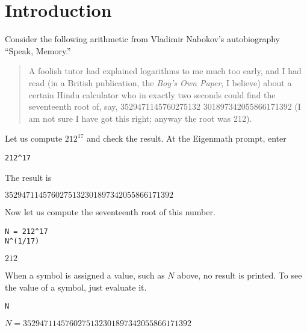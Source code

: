 \section{Introduction}

\noindent
Consider the following arithmetic from Vladimir Nabokov's autobiography ``Speak, Memory.''

\begin{quote}
A foolish tutor had explained logarithms to me much too early, and I had
read (in a British publication, the {\it Boy's Own Paper}, I believe)
about a certain Hindu calculator who in exactly two seconds could find the
seventeenth root of, say,
3529471145760275132 301897342055866171392
(I am not sure I have got this right; anyway the root was 212).
\end{quote}

\noindent
Let us compute $212^{17}$ and check the result.
At the Eigenmath prompt, enter

{\color{blue}
\begin{verbatim}
212^17
\end{verbatim}
}

\noindent
The result is

\bigskip
\noindent
$3529471145760275132301897342055866171392$

\bigskip
\noindent
Now let us compute the seventeenth root of this number.

{\color{blue}
\begin{verbatim}
N = 212^17
N^(1/17)
\end{verbatim}
}

\noindent
$212$

\bigskip
\noindent
When a symbol is assigned a value, such as $N$ above, no result is printed.
To see the value of a symbol, just evaluate it.

{\color{blue}
\begin{verbatim}
N
\end{verbatim}
}

\noindent
$N=3529471145760275132301897342055866171392$
